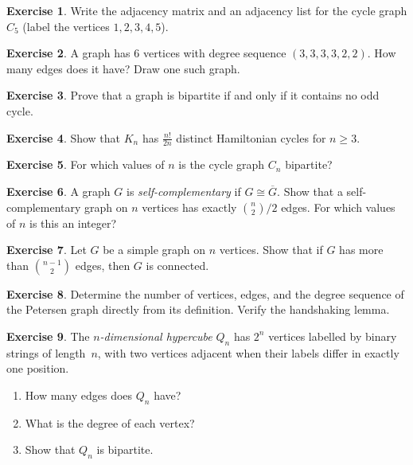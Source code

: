 \documentclass[12pt,a4paper,openany]{book}
\theoremstyle{definition}
\newtheorem{exercise}{Exercise}[chapter]
\theoremstyle{plain}
\theoremstyle{remark}
\begin{document}
\begin{exercise}\label{exo:graph2}
Write the adjacency matrix and an adjacency list for the cycle graph
$C_5$ (label the vertices $1, 2, 3, 4, 5$).
\end{exercise}

\begin{exercise}\label{exo:graph3}
A graph has $6$ vertices with degree sequence $(3, 3, 3, 3, 2, 2)$.
How many edges does it have?  Draw one such graph.
\end{exercise}

\begin{exercise}\label{exo:graph4}
Prove that a graph is bipartite if and only if it contains no odd cycle.
\end{exercise}

\begin{exercise}\label{exo:graph5}
Show that $K_n$ has $\frac{n!}{2n}$ distinct Hamiltonian cycles for
$n \ge 3$.
\end{exercise}

\begin{exercise}\label{exo:graph6}
For which values of $n$ is the cycle graph $C_n$ bipartite?
\end{exercise}

\begin{exercise}\label{exo:graph7}
A graph $G$ is \emph{self-complementary} if $G \cong \overline{G}$.
Show that a self-complementary graph on $n$ vertices has exactly
$\binom{n}{2}/2$ edges.  For which values of $n$ is this an integer?
\end{exercise}

\begin{exercise}\label{exo:graph8}
Let $G$ be a simple graph on $n$ vertices.  Show that if $G$ has more
than $\binom{n-1}{2}$ edges, then $G$ is connected.
\end{exercise}

\begin{exercise}\label{exo:graph9}
Determine the number of vertices, edges, and the degree sequence of the
Petersen graph directly from its definition.  Verify the handshaking lemma.
\end{exercise}

\begin{exercise}\label{exo:graph10}
The \emph{$n$-dimensional hypercube} $Q_n$
has $2^n$ vertices labelled by binary strings of length~$n$, with two
vertices adjacent when their labels differ in exactly one position.
\begin{enumerate}
\item How many edges does $Q_n$ have?
\item What is the degree of each vertex?
\item Show that $Q_n$ is bipartite.
\end{enumerate}
\end{exercise}
\end{document}
